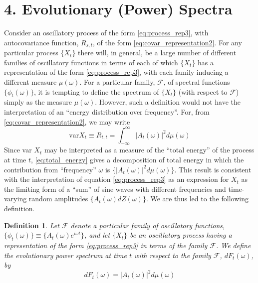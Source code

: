\documentclass{article}
\newtheorem{definition}{Definition}
\begin{document}
\section*{4. Evolutionary (Power) Spectra}

Consider an oscillatory process of the form \eqref{eq:process_rep3}, with
autocovariance function, $R_{s, t}$, of the form
\eqref{eq:covar_representation2}. For any particular process $\{X_t \}$ there
will, in general, be a large number of different families of oscillatory
functions in terms of each of which $\{X_t \}$ has a representation of the
form \eqref{eq:process_rep3}, with each family inducing a different measure
$\mu (\omega)$. For a particular family, $\mathscr{F}$, of spectral functions
$\{\phi_t (\omega)\}$, it is tempting to define the spectrum of $\{X_t \}$
(with respect to $\mathscr{F}$) simply as the measure $\mu (\omega)$. However,
such a definition would not have the interpretation of an ``energy
distribution over frequency''. For, from \eqref{eq:covar_representation2}, we
may write
\begin{equation}
  \label{eq:total_energy} \mathrm{var} X_t \equiv R_{t, t} = \int_{-
  \infty}^{\infty} |A_t (\omega) |^2 d \mu (\omega)
\end{equation}
Since var $X_t$ may be interpreted as a measure of the ``total energy'' of the
process at time $t$, \eqref{eq:total_energy} gives a decomposition of total
energy in which the contribution from ``frequency'' $\omega$ is $\{|A_t
(\omega) |^2 d \mu (\omega)\}$. This result is consistent with the
interpretation of equation \eqref{eq:process_rep3} as an expression for $X_t$
as the limiting form of a ``sum'' of sine waves with different frequencies and
time-varying random amplitudes $\{A_t (\omega) dZ (\omega)\}$. We are thus led
to the following definition.

\begin{definition}
  \label{def:evol_spectrum}Let $\mathscr{F}$ denote a particular family of
  oscillatory functions, $\{\phi_t (\omega)\} \equiv \{A_t (\omega) e^{i
  \omega t} \}$, and let $\{X_t \}$ be an oscillatory process having a
  representation of the form \eqref{eq:process_rep3} in terms of the family
  $\mathscr{F}$. We define the evolutionary power spectrum at time $t$ with
  respect to the family $\mathscr{F}$, $dF_t (\omega)$, by
  \begin{equation}
    \label{eq:evol_spectrum} dF_t (\omega) = |A_t (\omega) |^2 d \mu (\omega)
  \end{equation}
\end{definition}
\end{document}
